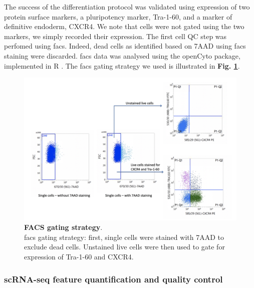 The success of the differentiation protocol was validated using expression of two protein surface markers, a pluripotency marker, Tra-1-60, and a marker of definitive endoderm, CXCR4. 
We note that cells were not gated using the two markers, we simply recorded their expression. 
The first cell QC step was perfomed using \gls{facs}.
Indeed, dead cells as identified based on 7AAD using \gls{facs} staining were discarded. 
\gls{facs} data was analysed using the openCyto package, implemented in R \cite{finak2014opencyto}.
The \gls{facs} gating strategy we used is illustrated in \textbf{Fig. \ref{fig:endodiff_facs_strategy}}.

\begin{figure}[h]
\centering
\includegraphics[width=14cm]{Chapter4/Fig/endodiff_facs_strategy.png}
\caption[FACS gating strategy]{\textbf{FACS gating strategy}.\\
\gls{facs} gating strategy: first, single cells were stained with 7AAD to exclude dead cells. 
Unstained live cells were then used to gate for expression of Tra-1-60 and CXCR4.}
\label{fig:endodiff_facs_strategy}
\end{figure}


\newpage


\subsubsection{scRNA-seq feature quantification and quality control}

